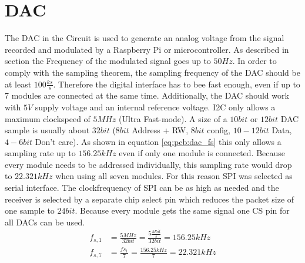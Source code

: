 \section{DAC}
%
%
The DAC in the Circuit is used to generate an analog voltage from the signal recorded and modulated by a Raspberry Pi or microcontroller.\p
%
As described in section  the Frequency of the modulated signal goes up to $50Hz$.
In order to comply with the sampling theorem, the sampling frequency of the DAC should be at least $100\frac{ks}{s}$. Therefore the digital interface has to bee fast enough, even if up to 7 modules are connected at the same time. Additionally, the DAC should work with $5V$ supply voltage and an internal reference voltage.\p
%
I2C only allows a maximum clockspeed of $5MHz$ (Ultra Fast-mode).\cite{nxp_i2c-bus_2021} A size of a $10bit$ or $12bit$ DAC sample is usually about $32bit$ ($8bit$ Address + RW, $8bit$ config, $10 - 12bit$ Data, $4 - 6bit$ Don't care). As shown in equation \ref{eq:pcb:dac_fs} this only allows a sampling rate up to $156.25kHz$ even if only one module is connected. Because every module needs to be addressed individually, this sampling rate would drop to $22.321kHz$ when using all seven modules. For this reason SPI was selected as serial interface. The clockfrequency of SPI can be as high as needed and the receiver is selected by a separate chip select pin which reduces the packet size of one sample to $24bit$. Because every module gets the same signal one CS pin for all DACs can be used.\p
%
%
\begin{align}
  f_{s,1} &= \frac{5MHz}{32bit} = \frac{5 \frac{Mbit}{s}}{32bit} = 156.25kHz \label{eq:pcb:dac_fs}\\[1em]
  f_{s, 7} &= \frac{fs_1}{7} = \frac{156.25kHz}{7} = 22.321kHz
\end{align}

